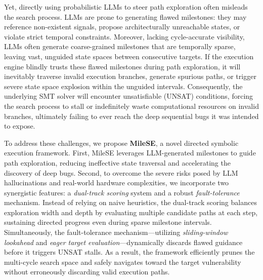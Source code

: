 \documentclass[conference]{IEEEtran}
\begin{document}
Yet, directly using probabilistic LLMs to steer path exploration often misleads the search process. LLMs are prone to generating flawed milestones: they may reference non-existent signals, propose architecturally unreachable states, or violate strict temporal constraints. Moreover, lacking cycle-accurate visibility, LLMs often generate coarse-grained milestones that are temporally sparse, leaving vast, unguided state spaces between consecutive targets. If the execution engine blindly trusts these flawed milestones during path exploration, it will inevitably traverse invalid execution branches, generate spurious paths, or trigger severe state space explosion within the unguided intervals. Consequently, the underlying SMT solver will encounter unsatisfiable (UNSAT) conditions, forcing the search process to stall or indefinitely waste computational resources on invalid branches, ultimately failing to ever reach the deep sequential bugs it was intended to expose.

To address these challenges, we propose \textbf{MileSE}, a novel directed symbolic execution framework. First, MileSE leverages LLM-generated milestones to guide path exploration, reducing ineffective state traversal and accelerating the discovery of deep bugs. Second, to overcome the severe risks posed by LLM hallucinations and real-world hardware complexities, we incorporate two synergistic features: a \textit{dual-track scoring} system and a robust \textit{fault-tolerance} mechanism. Instead of relying on naive heuristics, the dual-track scoring balances exploration width and depth by evaluating multiple candidate paths at each step, sustaining directed progress even during sparse milestone intervals. Simultaneously, the fault-tolerance mechanism—utilizing \textit{sliding-window lookahead} and \textit{eager target evaluation}—dynamically discards flawed guidance before it triggers UNSAT stalls. As a result, the framework efficiently prunes the multi-cycle search space and safely navigates toward the target vulnerability without erroneously discarding valid execution paths.


\end{document}
